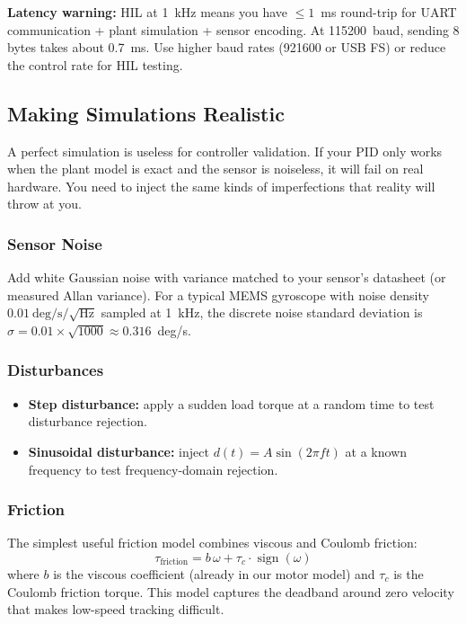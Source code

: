 \textbf{Latency warning:} HIL at 1~kHz means you have $\leq 1$~ms round-trip
for UART communication + plant simulation + sensor encoding. At 115200~baud,
sending 8 bytes takes about 0.7~ms. Use higher baud rates (921600 or USB FS)
or reduce the control rate for HIL testing.

\subsection{Making Simulations Realistic}

A perfect simulation is useless for controller validation. If your PID only
works when the plant model is exact and the sensor is noiseless, it will fail
on real hardware. You need to inject the same kinds of imperfections that
reality will throw at you.

\subsubsection{Sensor Noise}

Add white Gaussian noise with variance matched to your sensor's datasheet (or
measured Allan variance). For a typical MEMS gyroscope with noise density
$0.01~\text{deg/s}/\sqrt{\text{Hz}}$ sampled at 1~kHz, the discrete noise
standard deviation is $\sigma = 0.01 \times \sqrt{1000} \approx
0.316$~deg/s.

\subsubsection{Disturbances}

\begin{itemize}
    \item \textbf{Step disturbance:} apply a sudden load torque at a random
          time to test disturbance rejection.
    \item \textbf{Sinusoidal disturbance:} inject $d(t) = A\sin(2\pi f t)$ at
          a known frequency to test frequency-domain rejection.
\end{itemize}

\subsubsection{Friction}

The simplest useful friction model combines viscous and Coulomb friction:
\begin{equation}
\tau_{\text{friction}} = b\,\omega + \tau_c \cdot \operatorname{sign}(\omega)
\end{equation}
where $b$ is the viscous coefficient (already in our motor model) and
$\tau_c$ is the Coulomb friction torque. This model captures the deadband
around zero velocity that makes low-speed tracking difficult.

